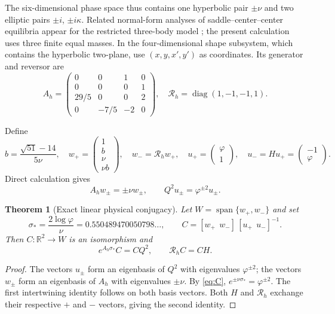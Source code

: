 \documentclass[11pt,letterpaper]{article}
\theoremstyle{paper}
\newtheorem{theorem}{Theorem}
\newcommand{\Rvs}{\mathscr R}
\begin{document}
The six-dimensional phase space thus contains one hyperbolic pair $\pm\nu$ and two elliptic pairs $\pm i$, $\pm i\kappa$. Related normal-form analyses of saddle--center--center equilibria appear for the restricted three-body model \cite{jorba}; the present calculation uses three finite equal masses. In the four-dimensional shape subsystem, which contains the hyperbolic two-plane, use $(x,y,x',y')$ as coordinates. Its generator and reversor are
\begin{equation}
A_h=\begin{pmatrix}
0&0&1&0\\0&0&0&1\\29/5&0&0&2\\0&-7/5&-2&0
\end{pmatrix},
\quad
\Rvs_h=\operatorname{diag}(1,-1,-1,1).
\label{eq:Ah}
\end{equation}

Define
\begin{equation}
b=\frac{\sqrt{51}-14}{5\nu},\quad
w_+=\begin{pmatrix}1\\b\\\nu\\\nu b\end{pmatrix},\quad
w_-=\Rvs_hw_+,
\quad
u_+=\begin{pmatrix}\varphi\\1\end{pmatrix},\quad
u_-=Hu_+=\begin{pmatrix}-1\\\varphi\end{pmatrix}.
\label{eq:modes}
\end{equation}
Direct calculation gives
\begin{equation}
A_hw_\pm=\pm\nu w_\pm,
\qquad Q^2u_\pm=\varphi^{\pm2}u_\pm.
\end{equation}

\begin{theorem}[Exact linear physical conjugacy]
Let $W=\operatorname{span}\{w_+,w_-\}$ and set
\begin{equation}
\sigma_* =\frac{2\log\varphi}{\nu}=0.550489470050798\ldots,
\qquad
C=[w_+\ \ w_-]\,[u_+\ \ u_-]^{-1}.
\label{eq:C}
\end{equation}
Then $C:\mathbb R^2\to W$ is an isomorphism and
\begin{equation}
\boxed{e^{A_h\sigma_*}C=CQ^2,\qquad \Rvs_h C=CH.}
\label{eq:intertwine}
\end{equation}
\end{theorem}
\begin{proof}
The vectors $u_\pm$ form an eigenbasis of $Q^2$ with eigenvalues $\varphi^{\pm2}$; the vectors $w_\pm$ form an eigenbasis of $A_h$ with eigenvalues $\pm\nu$. By \eqref{eq:C}, $e^{\pm\nu\sigma_*}=\varphi^{\pm2}$. The first intertwining identity follows on both basis vectors. Both $H$ and $\Rvs_h$ exchange their respective $+$ and $-$ vectors, giving the second identity.
\end{proof}
\end{document}
